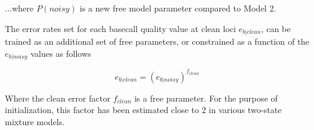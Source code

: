 \documentclass{article}
\begin{document}
...where $P(noisy)$ is a new free model parameter compared to Model 2.

The error rates set for each basecall quality value at clean loci $e_{b|clean}$, can be trained as an additional set of free parameters, or constrained as a function of the $e_{b|noisy}$ values as follows

\begin{equation*}
e_{b|clean} = (e_{b|noisy})^{f_{clean}}
\end{equation*}

Where the clean error factor $f_{clean}$ is a free parameter. For the purpose of initialization, this factor has been estimated close to 2 in various two-state mixture models.




\end{document}
